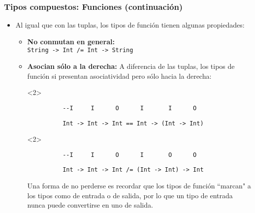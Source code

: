 \documentclass{beamer}
\begin{document}
\begin{frame}[fragile]
  \frametitle{Tipos compuestos: Funciones (continuación)}

  \begin{itemize}
    \item Al igual que con las tuplas, los tipos de función tienen algunas propiedades:
      \begin{itemize}
        \item \textbf{No conmutan en general:}\\
          \texttt{String -> Int /= Int -> String}
        \item \textbf{Asocian sólo a la derecha:} A diferencia de las tuplas, los tipos
          de función si presentan asociatividad pero sólo hacia la derecha:\\
          \begin{onlyenv}<2>
            \begin{verbatim}
          --I     I      O      I       I      O
            \end{verbatim}
          \end{onlyenv}
          \begin{verbatim}
          Int -> Int -> Int == Int -> (Int -> Int)
          \end{verbatim}
          \begin{onlyenv}<2>
            \begin{verbatim}
          --I     I      O      I       O      O
            \end{verbatim}
          \end{onlyenv}
          \begin{verbatim}
          Int -> Int -> Int /= (Int -> Int) -> Int
          \end{verbatim}
          Una forma de no perderse es recordar que los tipos de función ``marcan"
          a los tipos como de entrada o de salida, por lo que un tipo de entrada nunca
          puede convertirse en uno de salida.
      \end{itemize}
  \end{itemize}

\end{frame}
\end{document}
